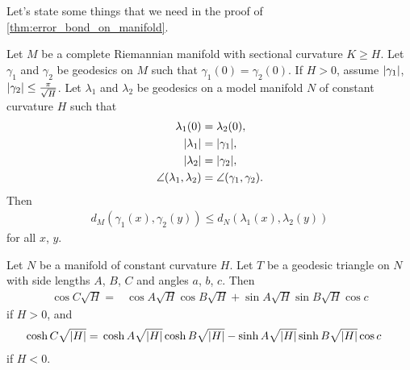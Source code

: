 \documentclass[english, a4paper, 12pt]{article}
\begin{document}
\bigskip

Let's state some things that we need in the proof of \cref{thm:error_bond_on_manifold}.

\begin{theorem}[Toponogov]\label{thm:toponogov}
	Let $M$ be a complete Riemannian manifold with sectional curvature $K \geq H$.
	Let $\gamma_1$ and $\gamma_2$ be geodesics on $M$ such that $\gamma_1(0) = \gamma_2(0)$.
	If $H > 0$, assume $\abs{\gamma_1}$, $\abs{\gamma_2} \leq \frac{\pi}{\sqrt{H}}$.
	Let $\lambda_1$ and $\lambda_2$ be geodesics on a model manifold $N$ of constant curvature $H$ such that
	\begin{align}
		\lambda_1(0) ={}& \lambda_2(0),\\
		\abs{\lambda_1} ={}& \abs{\gamma_1},\\
		\abs{\lambda_2} ={}& \abs{\gamma_2},\\
		\angle(\lambda_1, \lambda_2) ={}& \angle(\gamma_1, \gamma_2).
	\end{align}
	Then
	\begin{align}
		d_{M}(\gamma_1(x), \gamma_2(y)) \leq d_{N}(\lambda_1(x), \lambda_2(y))
	\end{align}
	for all $x$, $y$.
\end{theorem}

\begin{lemma}\label{lemma:law_of_cosines}
	Let $N$ be a manifold of constant curvature $H$.
	Let $T$ be a geodesic triangle on $N$ with side lengths $A$, $B$, $C$ and angles $a$, $b$, $c$.
	Then
	\begin{align}
		\cos{C \sqrt{H}} ={}& \cos{A \sqrt{H}} \cos{B \sqrt{H}} + \sin{A \sqrt{H}} \sin{B \sqrt{H}} \cos{c}
	\end{align}
	if $H > 0$, and
	\begin{align}
		\cosh{C \sqrt{\abs{H}}} ={}& \cosh{A \sqrt{\abs{H}}} \cosh{B \sqrt{\abs{H}}} - \sinh{A \sqrt{\abs{H}}} \sinh{B \sqrt{\abs{H}}} \cos{c}
	\end{align}
	if $H < 0$.
\end{lemma}

\bigskip
\end{document}
